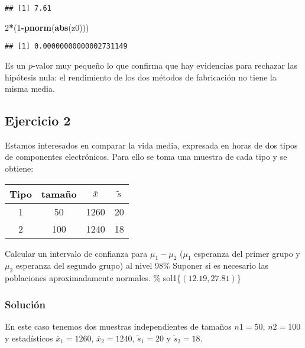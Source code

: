 \documentclass[
]{article}
\newenvironment{Shaded}{\begin{snugshade}}{\end{snugshade}}
\newcommand{\DecValTok}[1]{\textcolor[rgb]{0.00,0.00,0.81}{#1}}
\newcommand{\KeywordTok}[1]{\textcolor[rgb]{0.13,0.29,0.53}{\textbf{#1}}}
\newcommand{\NormalTok}[1]{#1}
\newcommand{\OperatorTok}[1]{\textcolor[rgb]{0.81,0.36,0.00}{\textbf{#1}}}
\begin{document}
\begin{verbatim}
## [1] 7.61
\end{verbatim}

\begin{Shaded}
\begin{Highlighting}[]
\DecValTok{2}\OperatorTok{*}\NormalTok{(}\DecValTok{1}\OperatorTok{{-}}\KeywordTok{pnorm}\NormalTok{(}\KeywordTok{abs}\NormalTok{(z0)))}
\end{Highlighting}
\end{Shaded}

\begin{verbatim}
## [1] 0.00000000000002731149
\end{verbatim}

Es un \(p\)-valor muy pequeño lo que confirma que hay evidencias para
rechazar las hipótesis nula: el rendimiento de los dos métodos de
fabricación no tiene la misma media.

\hypertarget{ejercicio-2}{%
\subsection{Ejercicio 2}\label{ejercicio-2}}

Estamos interesados en comparar la vida media, expresada en horas de dos
tipos de componentes electrónicos. Para ello se toma una muestra de cada
tipo y se obtiene:

\begin{center}
\begin{tabular}{|c|c|c|c|}
\hline Tipo & tamaño & $\overline{x}$ & $\tilde{s}$\\ \hline \hline 1 & 50 & 1260 & 20\\ \hline 2 &
100 & 1240 & 18\\ \hline
\end{tabular}
\end{center}

Calcular un intervalo de confianza para \(\mu_{1}-\mu_{2}\) (\(\mu_{1}\)
esperanza del primer grupo y \(\mu_{2}\) esperanza del segundo grupo) al
nivel 98\% Suponer si es necesario las poblaciones aproximadamente
normales. \% sol1\{\(\left(12.19,27.81\right)\)\}

\hypertarget{soluciuxf3n-1}{%
\subsubsection{Solución}\label{soluciuxf3n-1}}

En este caso tenemos dos muestras independientes de tamaños \(n1=50\),
\(n2=100\) y estadísticos \(\overline{x}_1=1260\),
\(\overline{x}_2=1240\), \(\tilde{s}_1=20\) y \(\tilde{s}_2=18\).
\end{document}
